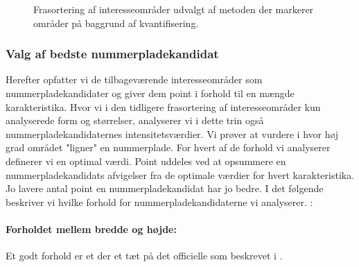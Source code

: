\begin{figure}[htbp]
  \centering
  \begin{minipage}[b]{5 cm}
  \end{minipage}
  \begin{minipage}[b]{5 cm}
  \end{minipage}
  \caption{Frasortering af interesseområder udvalgt af metoden der markerer områder på baggrund af kvantifisering.}
   \label{fig:DetectQuant-cleanup}
\end{figure}


\subsubsection{Valg af bedste nummerpladekandidat}
\label{sec:GetBestCandidate}
Herefter opfatter vi de tilbageværende interesseområder som nummerpladekandidater og giver dem point i forhold til en mængde karakteristika. Hvor vi i den tidligere frasortering af interesseområder kun analyserede form og størrelser, analyserer vi i dette trin også nummerpladekandidaternes intensitetsværdier. Vi prøver at vurdere i hvor høj grad området "ligner" en nummerplade. For hvert af de forhold vi analyserer definerer vi en optimal værdi. Point uddeles ved at opsummere en nummerpladekandidats afvigelser fra de optimale værdier for hvert karakteristika. Jo lavere antal point en nummerpladekandidat har jo bedre. I det følgende beskriver vi hvilke forhold for nummerpladekandidaterne vi analyserer. :

\paragraph*{Forholdet mellem bredde og højde:}
Et godt forhold er et der et tæt på det officielle som beskrevet i \cite{dkplates}.

